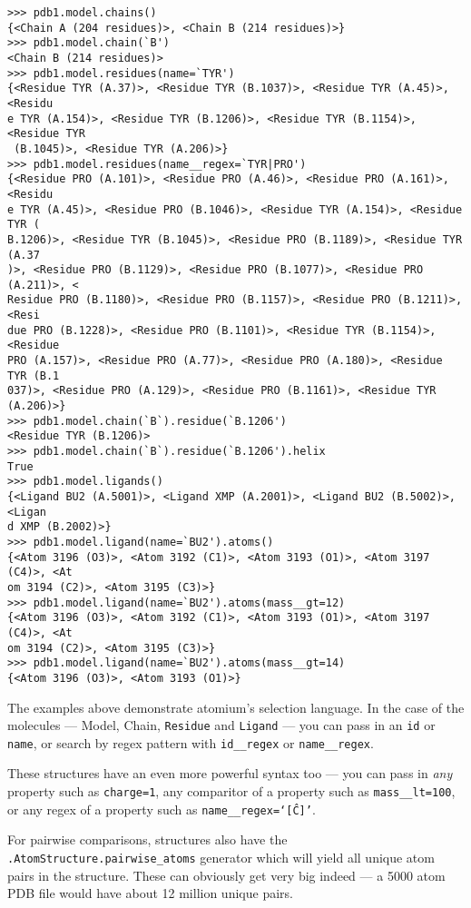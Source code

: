 \begin{verbatim}
>>> pdb1.model.chains()
{<Chain A (204 residues)>, <Chain B (214 residues)>}
>>> pdb1.model.chain(`B')
<Chain B (214 residues)>
>>> pdb1.model.residues(name=`TYR')
{<Residue TYR (A.37)>, <Residue TYR (B.1037)>, <Residue TYR (A.45)>, <Residu
e TYR (A.154)>, <Residue TYR (B.1206)>, <Residue TYR (B.1154)>, <Residue TYR
 (B.1045)>, <Residue TYR (A.206)>}
>>> pdb1.model.residues(name__regex=`TYR|PRO')
{<Residue PRO (A.101)>, <Residue PRO (A.46)>, <Residue PRO (A.161)>, <Residu
e TYR (A.45)>, <Residue PRO (B.1046)>, <Residue TYR (A.154)>, <Residue TYR (
B.1206)>, <Residue TYR (B.1045)>, <Residue PRO (B.1189)>, <Residue TYR (A.37
)>, <Residue PRO (B.1129)>, <Residue PRO (B.1077)>, <Residue PRO (A.211)>, <
Residue PRO (B.1180)>, <Residue PRO (B.1157)>, <Residue PRO (B.1211)>, <Resi
due PRO (B.1228)>, <Residue PRO (B.1101)>, <Residue TYR (B.1154)>, <Residue
PRO (A.157)>, <Residue PRO (A.77)>, <Residue PRO (A.180)>, <Residue TYR (B.1
037)>, <Residue PRO (A.129)>, <Residue PRO (B.1161)>, <Residue TYR (A.206)>}
>>> pdb1.model.chain(`B`).residue(`B.1206')
<Residue TYR (B.1206)>
>>> pdb1.model.chain(`B`).residue(`B.1206').helix
True
>>> pdb1.model.ligands()
{<Ligand BU2 (A.5001)>, <Ligand XMP (A.2001)>, <Ligand BU2 (B.5002)>, <Ligan
d XMP (B.2002)>}
>>> pdb1.model.ligand(name=`BU2').atoms()
{<Atom 3196 (O3)>, <Atom 3192 (C1)>, <Atom 3193 (O1)>, <Atom 3197 (C4)>, <At
om 3194 (C2)>, <Atom 3195 (C3)>}
>>> pdb1.model.ligand(name=`BU2').atoms(mass__gt=12)
{<Atom 3196 (O3)>, <Atom 3192 (C1)>, <Atom 3193 (O1)>, <Atom 3197 (C4)>, <At
om 3194 (C2)>, <Atom 3195 (C3)>}
>>> pdb1.model.ligand(name=`BU2').atoms(mass__gt=14)
{<Atom 3196 (O3)>, <Atom 3193 (O1)>}
\end{verbatim}


The examples above demonstrate atomium's selection language. In the case of the
molecules --- Model, Chain, \texttt{Residue} and
\texttt{Ligand} --- you can pass in an \texttt{id} or \texttt{name}, or search by regex
pattern with \texttt{id\_\_regex} or \texttt{name\_\_regex}.

These structures have an even more powerful syntax too --- you can pass in \emph{any}
property such as \texttt{charge=1}, any comparitor of a property such as
\texttt{mass\_\_lt=100}, or any regex of a property such as \texttt{name\_\_regex=`[\^C]'}.

For pairwise comparisons, structures also have the
\texttt{.AtomStructure.pairwise\_atoms} generator which will yield all
unique atom pairs in the structure. These can obviously get very big indeed --- a
5000 atom PDB file would have about 12 million unique pairs.

